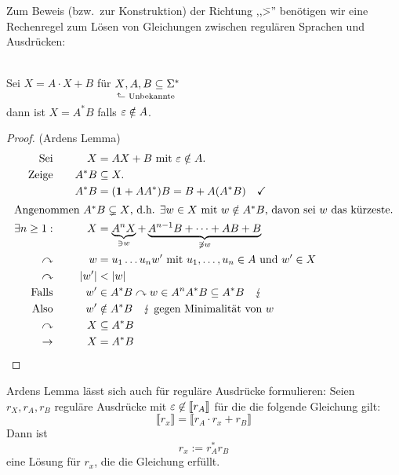 Zum Beweis (bzw.\ zur Konstruktion) der Richtung ,,\=>'' benötigen wir eine Rechenregel zum Lösen von Gleichungen zwischen regulären Sprachen und Ausdrücken:
\begin{lemma}\label{lem:arden}\ \\
        Sei $X=A\cdot X+B$ für $\underset{\vphantom{\big(}\ \mathrlap{\hspace{-4pt}\rotatebox[origin=c]{90}{$\Rsh$}\ \text{Unbekannte}}}{X} ,A,B\subseteq \Sigma^*$\\
        dann ist $X=A^*B$ falls $\varepsilon\notin A$.
\end{lemma}

\begin{proof}(Ardens Lemma)
        \begin{alignat*}{3}
                \text{Sei}&\quad& X&= AX+B\text{ mit }\Eps\notin A.\\
                \text{Zeige}&& A^*B&\subseteq X.\\
                && A^*B &= (\1+AA^*)B = B+A(A^*B) \quad\checkmark\\
                \shortintertext{Angenommen $A^*B \subsetneq X$, d.h. $\exists w\in X$ mit $w\notin A^*B$, davon sei $w$ das kürzeste.}
                \exists n\geq 1: && X &= \underbrace{A^nX}_{\ni w} + \underbrace{A^{n-1}B+\dots +AB+B}_{\not\ni w}\\
                \curvearrowright && w &= u_1\dots u_n w'\text{ mit } u_1,\dots,u_n\in A\text{ und } w'\in X\\
                \curvearrowright && |w'| &< |w|\\
                \text{Falls}&& w'&\in A^*B \curvearrowright w\in A^nA^*B\subseteq A^*B \quad \lightning\\
                \text{Also} && w'&\notin A^*B \quad\lightning\text{ gegen Minimalität von }w\\
                \curvearrowright && X&\subseteq A^*B\\
                \-> && X &= A^*B \tag*{\qedhere}
        \end{alignat*}
\end{proof}

\begin{Korollar}
  Ardens Lemma lässt sich auch für reguläre Ausdrücke formulieren: Seien $r_X,r_A,r_B$ reguläre Ausdrücke mit $\varepsilon \not \in \llbracket r_A \rrbracket$ für die die folgende Gleichung gilt:
  \begin{displaymath}
    \llbracket r_x \rrbracket = \llbracket r_A \cdot r_x + r_B \rrbracket
  \end{displaymath}
  Dann ist 
  \begin{displaymath}
    r_x := r_A^*r_B
  \end{displaymath}
  eine Lösung für $r_x$, die die Gleichung erfüllt.
\end{Korollar}

